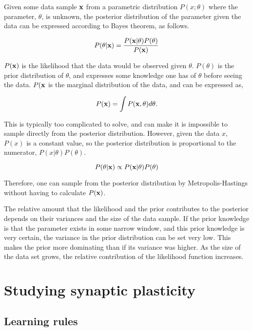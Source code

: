 Given some data sample ${\bf x}$ from a parametric distribution $P(x;\theta)$ where the parameter, $\theta$, is unknown, the posterior distribution of the parameter given the data can be expressed according to Bayes theorem, as follows.

\begin{equation}
    P(\theta | {\bf x}) = \frac{P({ \bf x}|\theta)P(\theta)}{P({\bf x})}
\end{equation}

$P({\bf x})$ is the likelihood that the data would be observed given $\theta$. $P(\theta)$ is the prior distribution of $\theta$, and expresses some knowledge one has of $\theta$ before seeing the data. $P({\bf x}$ is the marginal distribution of the data, and can be expressed as,

\begin{equation}
    P({\bf x}) = \int P({\bf x},\theta)d\theta.
\end{equation}

This is typically too complicated to solve, and can make it is impossible to sample directly from the posterior distribution. However, given the data $x$, $P(x)$ is a constant value, so the posterior distribution is proportional to the numerator, $P(x|\theta)P(\theta)$. 

\begin{equation}
    P(\theta | {\bf x}) \propto P({\bf x}|\theta)P(\theta)
\end{equation}

Therefore, one can sample from the posterior distribution by Metropolis-Hastings without having to calculate $P({\bf x})$.

 The relative amount that the likelihood and the prior contributes to the posterior depends on their variances and the size of the data sample. If the prior knowledge is that the parameter exists in some narrow window, and this prior knowledge is very certain, the variance in the prior distribution can be set very low. This makes the prior more dominating than if its variance was higher. As the size of the data set grows, the relative contribution of the likelihood function increases. 



\section{Studying synaptic plasticity}
\subsection{Learning rules}
\label{sec:LR}

